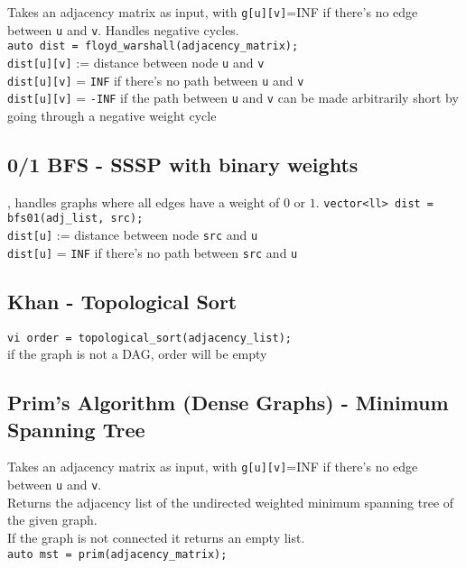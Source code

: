 Takes an adjacency matrix as input, with \verb|g[u][v]|=INF if there's no edge between \verb|u| and \verb|v|. Handles negative cycles. \\
\verb|auto dist = floyd_warshall(adjacency_matrix);| \\
\verb|dist[u][v]| := distance between node \verb|u| and \verb|v| \\
\verb|dist[u][v]| = \verb|INF| if there's no path between \verb|u| and \verb|v| \\
\verb|dist[u][v]| = \verb|-INF| if the path between \verb|u| and \verb|v| can be made arbitrarily short by going through a negative weight cycle


\subsection{0/1 BFS - SSSP with binary weights}
, handles graphs where all edges have a weight of $0$ or $1$.
\verb|vector<ll> dist = bfs01(adj_list, src);| \\
\verb|dist[u]| := distance between node \verb|src| and \verb|u| \\
\verb|dist[u]| = \verb|INF| if there's no path between \verb|src| and \verb|u|


\subsection{Khan - Topological Sort}

\verb|vi order = topological_sort(adjacency_list);| \\
if the graph is not a DAG, order will be empty



\subsection{Prim's Algorithm (Dense Graphs) - Minimum Spanning Tree}

Takes an adjacency matrix as input, with \verb|g[u][v]|=INF if there's no edge between \verb|u| and \verb|v|. \\
Returns the adjacency list of the undirected weighted minimum spanning tree of the given graph. \\
If the graph is not connected it returns an empty list. \\
\verb|auto mst = prim(adjacency_matrix);| \\



